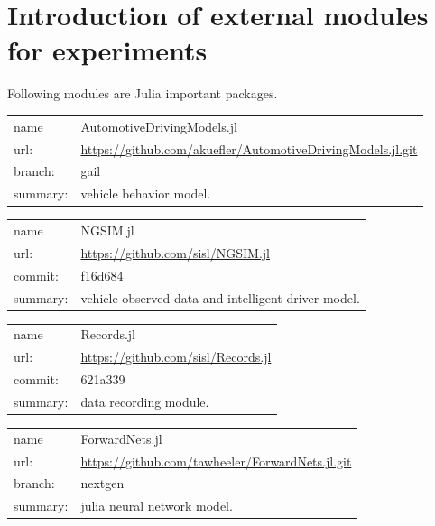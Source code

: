 \documentclass[openany,11pt]{report}%
\begin{document}

\chapter{Introduction of external modules for experiments}


Following modules are Julia important packages.

\begin{tabular}{|p{2cm}p{12cm}|} \hline
name & AutomotiveDrivingModels.jl \\
url: & \url{https://github.com/akuefler/AutomotiveDrivingModels.jl.git} \\ 
branch: & gail \\ 
summary: & vehicle behavior model. \\
\hline
\end{tabular}

\begin{tabular}{|p{2cm}p{12cm}|} \hline
name & NGSIM.jl  \\
url: & \url{https://github.com/sisl/NGSIM.jl} \\
commit: & f16d684 \\
summary: & vehicle observed data and intelligent driver model. \\
\hline
\end{tabular}

\begin{tabular}{|p{2cm}p{12cm}|} \hline
name & Records.jl \\
url: & \url{https://github.com/sisl/Records.jl} \\
commit: & 621a339 \\
summary: & data recording module. \\
\hline
\end{tabular}

\begin{tabular}{|p{2cm}p{12cm}|} \hline
name & ForwardNets.jl \\
url: & \url{https://github.com/tawheeler/ForwardNets.jl.git} \\
branch: & nextgen \\
summary: & julia neural network model. \\
\hline
\end{tabular}
\end{document}
